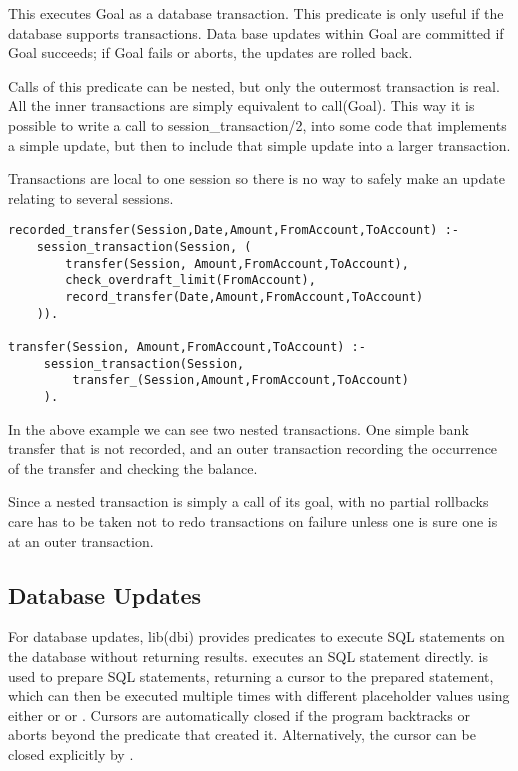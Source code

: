 This executes Goal as a database transaction. This predicate is only useful
if the database supports transactions. Data base updates within Goal are
committed if Goal succeeds; if Goal fails or aborts, the updates are rolled
back. 

Calls of this predicate can be nested, but only the outermost
transaction is real. All the inner transactions are simply
equivalent to call(Goal).
This way it is possible to write a call to
session_transaction/2, into some code that implements a simple
update, but then to include that simple update into a larger
transaction.

Transactions are local to one session so there is no way to safely
make an update relating to several sessions.

\begin{verbatim}
recorded_transfer(Session,Date,Amount,FromAccount,ToAccount) :-
    session_transaction(Session, (
        transfer(Session, Amount,FromAccount,ToAccount),
        check_overdraft_limit(FromAccount),
        record_transfer(Date,Amount,FromAccount,ToAccount)
    )).

transfer(Session, Amount,FromAccount,ToAccount) :-
     session_transaction(Session, 
         transfer_(Session,Amount,FromAccount,ToAccount)
     ).

\end{verbatim}

In the above example we can see two nested transactions. One simple bank
transfer that is not recorded, and an outer transaction recording the
occurrence of the transfer and checking the balance.

Since a nested transaction is simply a call of its goal, with no
partial rollbacks care has to be taken not to redo transactions on
failure unless one is sure one is at an outer transaction.

\subsection{Database Updates}


For database updates, lib(dbi) provides predicates to execute SQL
statements on the database without returning results. 
 executes
an SQL statement directly.  is used to
prepare SQL statements, returning a cursor to the prepared statement,
which can then be executed
multiple times with different placeholder values using either
 or
 or
.
Cursors are automatically closed if the program backtracks or aborts beyond
the predicate that created it. Alternatively, the cursor can be closed
explicitly by .

